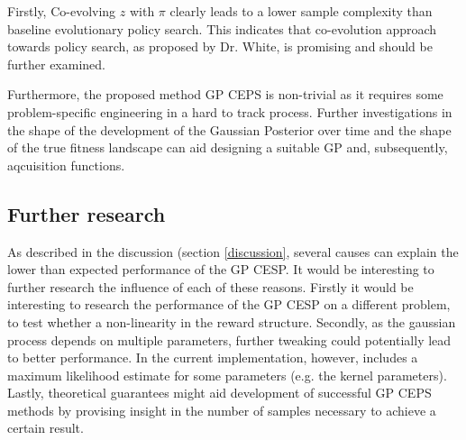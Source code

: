 Firstly, Co-evolving $z$ with $\pi$ clearly leads to a lower sample complexity than baseline evolutionary policy search. This indicates that co-evolution approach towards policy search, as proposed by Dr. White, is promising and should be further examined.

Furthermore, the proposed method GP CEPS is non-trivial as it requires some problem-specific engineering in a hard to track process. Further investigations in the shape of the development of the Gaussian Posterior over time and the shape of the true fitness landscape can aid designing a suitable GP and, subsequently, aqcuisition functions. 

\subsection{Further research}
As described in the discussion (section \ref{discussion}, several causes can explain the lower than expected performance of the GP CESP. It would be interesting to further research the influence of each of these reasons. Firstly it would be interesting to research the performance of the GP CESP on a different problem, to test whether a non-linearity in the reward structure. Secondly, as the gaussian process depends on multiple parameters, further tweaking could potentially lead to better performance. In the current implementation, however, includes a maximum likelihood estimate for some parameters (e.g. the kernel parameters). Lastly, theoretical guarantees might aid development of successful GP CEPS methods by provising insight in the number of samples necessary to achieve a certain result.

